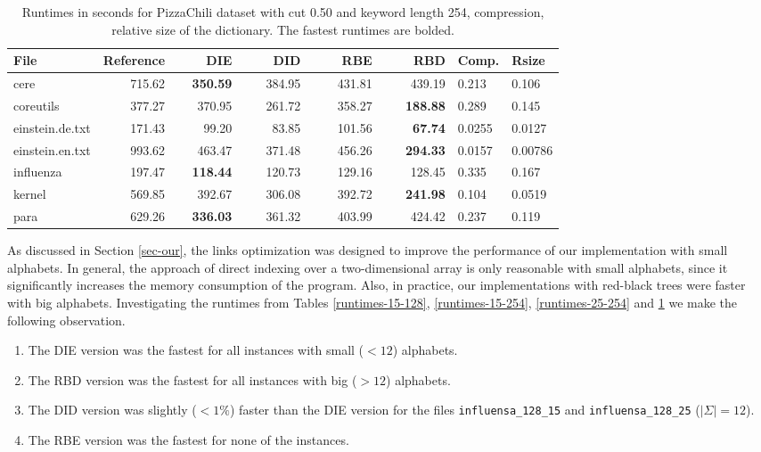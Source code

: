 \documentclass[english,twoside,censored,csm,algorithms-track-2020]{HYthesisML}
\theoremstyle{plain}
\theoremstyle{definition}
\begin{document}
\begin{center}
  \begin{table}
  \begin{tabular} {| l |r r r r r|l l|}
    \hline
    \textbf{File} & \textbf{Reference} & ~~~~\textbf{DIE} & ~~~~\textbf{DID} & ~~~~\textbf{RBE} & ~~~~\textbf{RBD} & \textbf{Comp.} & \textbf{Rsize} \\
    \hline
    cere & 715.62 & \textbf{350.59} & 384.95 & 431.81 & 439.19            & 0.213  & 0.106   \\
    coreutils & 377.27 & 370.95 & 261.72 & 358.27 & \textbf{188.88}       & 0.289  & 0.145   \\
    einstein.de.txt & 171.43 & 99.20 & 83.85 & 101.56 & \textbf{67.74}    & 0.0255 & 0.0127  \\
    einstein.en.txt & 993.62 & 463.47 & 371.48 & 456.26 & \textbf{294.33} & 0.0157 & 0.00786 \\
    influenza & 197.47 & \textbf{118.44} & 120.73 & 129.16 & 128.45       & 0.335  & 0.167   \\
    kernel & 569.85 & 392.67 & 306.08 & 392.72 & \textbf{241.98}          & 0.104  & 0.0519  \\
    para & 629.26 & \textbf{336.03} & 361.32 & 403.99 & 424.42            & 0.237  & 0.119   \\
    \hline
  \end{tabular}
  \caption{Runtimes in seconds for PizzaChili dataset with cut 0.50 and keyword length 254, compression, relative size of the dictionary. The fastest runtimes are bolded.}
  \label{runtimes-50-254}
  \end{table}
\end{center}

\vspace{-4cm}
As discussed in Section \ref{sec-our}, the links optimization was designed to improve the performance
of our implementation with small alphabets. In general, the approach of direct indexing over a two-dimensional array is only reasonable with small alphabets, since it significantly increases
the memory consumption of the program. Also, in practice, our implementations with red-black trees
were faster with big alphabets. Investigating the runtimes from Tables \ref{runtimes-15-128},
\ref{runtimes-15-254}, \ref{runtimes-25-254} and \ref{runtimes-50-254} we make the following observation.

\begin{enumerate}
\item The DIE version was the fastest for all instances with small ($<12$) alphabets.
\item The RBD version was the fastest for all instances with big ($>12$) alphabets.
\item The DID version was slightly ($<1\%$) faster than the DIE version for the files \texttt{influensa\_128\_15} and \texttt{influensa\_128\_25} ($|\Sigma| = 12$).
\item The RBE version was the fastest for none of the instances.
\end{enumerate}
\end{document}
